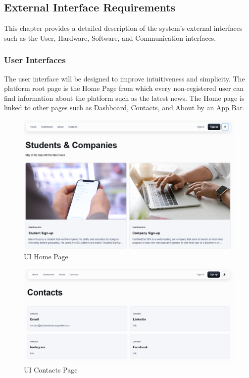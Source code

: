 \subsection{External Interface Requirements}
This chapter provides a detailed description of the system's external interfaces such as the User, Hardware, Software, and Communication interfaces. 
\subsubsection{User Interfaces}
The user interface will be designed to improve intuitiveness and simplicity. The platform root page is the Home Page from which every non-registered user can find information about the platform such as the latest news. The Home page is linked to other pages such as Dashboard, Contacts, and About by an App Bar. 
\begin{figure}[H]
    \centering
    \includegraphics[width=\textwidth]{Latex/Images/HomePage.png}
    \caption{UI Home Page}
    \label{fig:homepage}
\end{figure}
\begin{figure}[H]
    \centering
    \includegraphics[width=\textwidth]{Latex/Images/ContactPage.png}
    \caption{UI Contacts Page}
    \label{fig:contactpage}
\end{figure}
